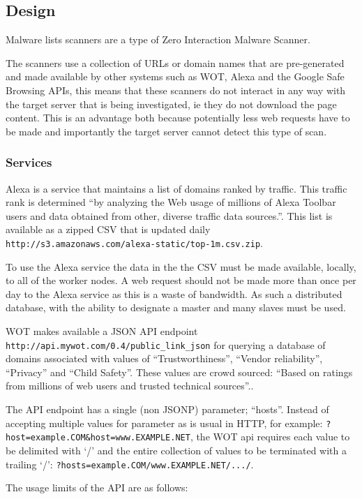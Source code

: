 \subsection{Design}
Malware lists scanners are a type of Zero Interaction Malware Scanner.

The scanners use a collection of URLs or domain names that are pre-generated and made available by other systems such as WOT, Alexa and the Google Safe Browsing APIs, this means that these scanners do not interact in any way with the target server that is being investigated, ie they do not download the page content. This is an advantage both because potentially less web requests have to be made and importantly the target server cannot detect this type of scan.


\subsubsection{Services} Alexa is a service that maintains a list of domains ranked by traffic. This traffic rank is determined ``by analyzing the Web usage of millions of Alexa Toolbar users and data obtained from other, diverse traffic data sources.''\cite{alexa-about}. This list is available as a zipped CSV that is updated daily \verb`http://s3.amazonaws.com/alexa-static/top-1m.csv.zip`.

To use the Alexa service the data in the the CSV must be made available, locally, to all of the worker nodes. A web request should not be made more than once per day to the Alexa service as this is a waste of bandwidth. As such a distributed database, with the ability to designate a master and many slaves must be used.

WOT makes available a JSON API endpoint \verb`http://api.mywot.com/0.4/public_link_json` for querying a database of domains associated with values of ``Trustworthiness'', ``Vendor reliability'', ``Privacy'' and ``Child Safety''. These values are crowd sourced: ``Based on ratings from millions of web users and trusted technical sources''.\cite{wot-about}.

The API endpoint has a single (non JSONP\cite{JSONP}) parameter; ``hosts''. Instead of accepting multiple values for parameter as is usual in HTTP, for example: \verb`?host=example.COM&host=www.EXAMPLE.NET`, the WOT api requires each value to be delimited with `/' and the entire collection of values to be terminated with a trailing `/': \verb`?hosts=example.COM/www.EXAMPLE.NET/.../`.

The usage limits of the API are as follows\cite{wot-about}:


